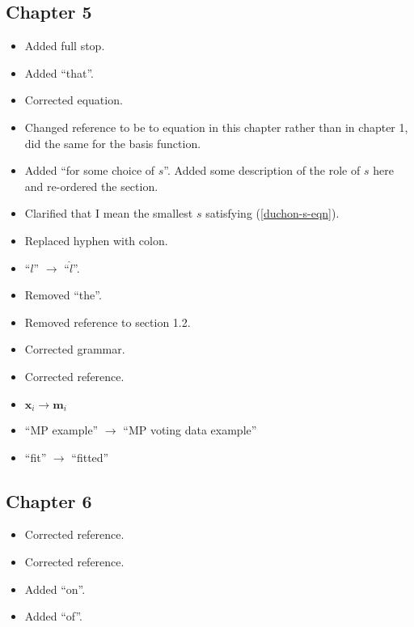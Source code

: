 \subsection{Chapter 5}
\begin{itemize}
\item {} Added full stop.
\item {} Added ``that''.
\item {} Corrected equation.
\item {} Changed reference to be to equation in this chapter rather than in chapter 1, did the same for the basis function.
\item {} Added ``for some choice of $s$''. Added some description of the role of $s$ here and re-ordered the section.
\item {} Clarified that I mean the smallest $s$ satisfying (\ref{duchon-s-eqn}).
\item {} Replaced hyphen with colon.
\item {} ``$l$'' $\rightarrow$ ``$\hat{l}$''.
\item {} Removed ``the''.
\item {} Removed reference to section 1.2.
\item {} Corrected grammar.
\item {} Corrected reference. 
\item {} $\mathbf{x}_{i} \rightarrow \mathbf{m}_{i}$
\item {} ``MP example'' $\rightarrow$ ``MP voting data example'' 
\item {} ``fit'' $\rightarrow$ ``fitted'' 
\end{itemize}

\subsection{Chapter 6}
\begin{itemize}
\item {} Corrected reference.
\item {} Corrected reference. 
\item {}  Added ``on''.
\item {} Added ``of''.
\end{itemize}

